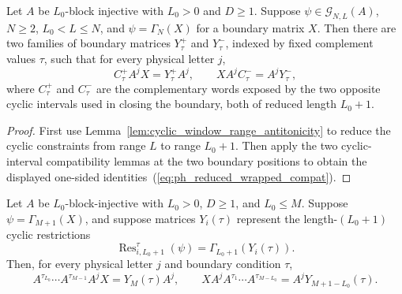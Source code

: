 \begin{theorem}%
    \label{thm:reduced_wrapped_boundary_compatibilities}
    \leanok
    Let $A$ be $L_0$-block injective with $L_0>0$ and $D \ge 1$.
    Suppose $\psi \in \mathcal G_{N,L}(A)$, $N \ge 2$, $L_0 < L \le N$, and
    $\psi = \Gamma_N(X)$ for a boundary matrix $X$. Then there are two families
    of boundary matrices $Y^+_\tau$ and $Y^-_\tau$, indexed by fixed complement
    values $\tau$, such that for every physical letter $j$,
    \begin{equation}\label{eq:ph_reduced_wrapped_compat}
        C^+_\tau A^j X = Y^+_\tau A^j,
        \qquad
        X A^j C^-_\tau = A^j Y^-_\tau,
    \end{equation}
    where $C^+_\tau$ and $C^-_\tau$ are the complementary words exposed by the
    two opposite cyclic intervals used in closing the boundary, both of reduced
    length $L_0+1$.
\end{theorem}

\begin{proof}
    \leanok
    First use Lemma~\ref{lem:cyclic_window_range_antitonicity} to reduce the
    cyclic constraints from range $L$ to range $L_0+1$. Then apply the two
    cyclic-interval compatibility lemmas at the two boundary positions to obtain
    the displayed one-sided identities~(\ref{eq:ph_reduced_wrapped_compat}).
\end{proof}

\begin{lemma}%
    \label{lem:closure_property_boundary_crossing_equations_ground_space_map}
    \leanok
    Let $A$ be $L_0$-block-injective with $L_0>0$, $D\ge1$, and $L_0\le M$.
    Suppose $\psi=\Gamma_{M+1}(X)$, and suppose matrices $Y_i(\tau)$ represent
    the length-$(L_0+1)$ cyclic restrictions
    \[
        \operatorname{Res}^{\tau}_{i,L_0+1}(\psi)
        =
        \Gamma_{L_0+1}(Y_i(\tau)).
    \]
    Then, for every physical letter $j$ and boundary condition $\tau$,
    \begin{equation}\label{eq:ph_closure_boundary_crossing_gamma_equations}
        A^{\tau_{L_0}}\cdots A^{\tau_{M-1}} A^j X
        =
        Y_M(\tau)A^j,
        \qquad
        X A^j A^{\tau_1}\cdots A^{\tau_{M-L_0}}
        =
        A^jY_{M+1-L_0}(\tau).
    \end{equation}
\end{lemma}

